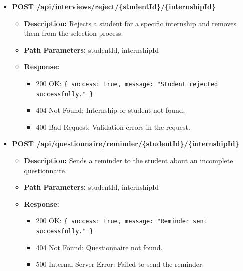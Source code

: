 \begin{itemize}
    \item \textbf{POST /api/interviews/reject/\{studentId\}/\{internshipId\}}  
    \begin{itemize}
        \item \textbf{Description:} Rejects a student for a specific internship and removes them from the selection process.
        \item \textbf{Path Parameters:} studentId, internshipId  
        \item \textbf{Response:}
        \begin{itemize}
            \item 200 OK: \texttt{\{ success: true, message: "Student rejected successfully." \}}
            \item 404 Not Found: Internship or student not found.
            \item 400 Bad Request: Validation errors in the request.
        \end{itemize}
    \end{itemize}

    \item \textbf{POST /api/questionnaire/reminder/\{studentId\}/\{internshipId\}}  
    \begin{itemize}
        \item \textbf{Description:} Sends a reminder to the student about an incomplete questionnaire.
        \item \textbf{Path Parameters:} studentId, internshipId  
        \item \textbf{Response:}
        \begin{itemize}
            \item 200 OK: \texttt{\{ success: true, message: "Reminder sent successfully." \}}
            \item 404 Not Found: Questionnaire not found.
            \item 500 Internal Server Error: Failed to send the reminder.
        \end{itemize}
    \end{itemize}


\end{itemize}
